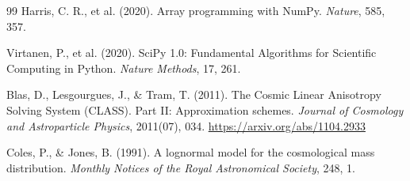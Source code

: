 \documentclass[letterpaper, 12pt]{article}
\begin{document}
\begin{thebibliography}{99}
         Harris, C. R., et al. (2020). Array programming with NumPy. \textit{Nature}, 585, 357.

         Virtanen, P., et al. (2020). SciPy 1.0: Fundamental Algorithms for Scientific Computing in Python. \textit{Nature Methods}, 17, 261.

         Blas, D., Lesgourgues, J., \& Tram, T. (2011). The Cosmic Linear Anisotropy Solving System (CLASS). Part II: Approximation schemes. \textit{Journal of Cosmology and Astroparticle Physics}, 2011(07), 034. \url{https://arxiv.org/abs/1104.2933}

         Coles, P., \& Jones, B. (1991). A lognormal model for the cosmological mass distribution. \textit{Monthly Notices of the Royal Astronomical Society}, 248, 1.

    \end{thebibliography}
\end{document}
